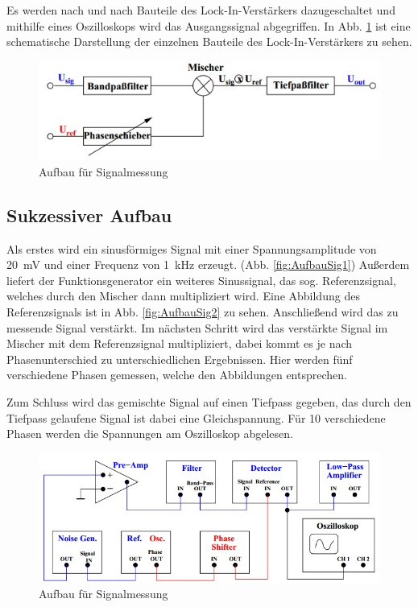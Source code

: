 Es werden nach und nach Bauteile des Lock-In-Verstärkers dazugeschaltet
und mithilfe eines Oszilloskops wird das Ausgangssignal abgegriffen. In Abb. \ref{fig:Schema} ist eine schematische Darstellung der einzelnen Bauteile des Lock-In-Verstärkers zu sehen.

\begin{figure}[h]
	\centering
	\includegraphics[scale=0.8]{Grafiken/V303Schema.jpg}
	\caption{Aufbau für Signalmessung}
	\label{fig:Schema}
\end{figure}

\subsection{Sukzessiver Aufbau}

Als erstes wird ein sinusförmiges Signal mit einer Spannungsamplitude
von \SI{20}{\milli\volt} und einer Frequenz von \SI{1}{\kilo\hertz} erzeugt. (Abb. \cref{fig:AufbauSig1}) Außerdem liefert der Funktionsgenerator ein weiteres Sinussignal, das sog. Referenzsignal, welches durch den Mischer dann multipliziert wird. Eine Abbildung des Referenzsignals ist in Abb. \cref{fig:AufbauSig2} zu sehen. Anschließend wird das zu messende Signal verstärkt. Im nächsten Schritt wird das verstärkte Signal im Mischer mit dem Referenzsignal multipliziert, dabei kommt es je nach Phasenunterschied zu unterschiedlichen Ergebnissen. Hier werden fünf verschiedene Phasen gemessen, welche den Abbildungen  entsprechen.

Zum Schluss wird das gemischte Signal auf einen Tiefpass gegeben, das durch den Tiefpass gelaufene Signal ist dabei eine Gleichspannung. Für 10 verschiedene Phasen werden die Spannungen am Oszilloskop abgelesen.

\begin{figure}[h]
	\centering
	\includegraphics[scale=0.8]{Grafiken/V303Aufbau1.jpg}
	\caption{Aufbau für Signalmessung}
	\label{fig:Aufbau1}
\end{figure}


